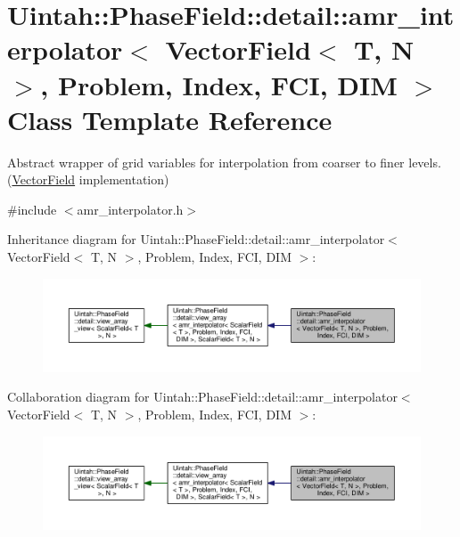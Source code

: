 \hypertarget{classUintah_1_1PhaseField_1_1detail_1_1amr__interpolator_3_01VectorField_3_01T_00_01N_01_4_00_01ab3739ebd28e1ffb5bc0b138cfaddd80}{}\section{Uintah\+:\+:Phase\+Field\+:\+:detail\+:\+:amr\+\_\+interpolator$<$ Vector\+Field$<$ T, N $>$, Problem, Index, F\+CI, D\+IM $>$ Class Template Reference}
\label{classUintah_1_1PhaseField_1_1detail_1_1amr__interpolator_3_01VectorField_3_01T_00_01N_01_4_00_01ab3739ebd28e1ffb5bc0b138cfaddd80}


Abstract wrapper of grid variables for interpolation from coarser to finer levels. (\hyperlink{structUintah_1_1PhaseField_1_1VectorField}{Vector\+Field} implementation)  




{\ttfamily \#include $<$amr\+\_\+interpolator.\+h$>$}



Inheritance diagram for Uintah\+:\+:Phase\+Field\+:\+:detail\+:\+:amr\+\_\+interpolator$<$ Vector\+Field$<$ T, N $>$, Problem, Index, F\+CI, D\+IM $>$\+:\nopagebreak
\begin{figure}[H]
\begin{center}
\leavevmode
\includegraphics[width=350pt]{classUintah_1_1PhaseField_1_1detail_1_1amr__interpolator_3_01VectorField_3_01T_00_01N_01_4_00_01ab5f6a8bab1985b8dc10c54b9c0965b3}
\end{center}
\end{figure}


Collaboration diagram for Uintah\+:\+:Phase\+Field\+:\+:detail\+:\+:amr\+\_\+interpolator$<$ Vector\+Field$<$ T, N $>$, Problem, Index, F\+CI, D\+IM $>$\+:\nopagebreak
\begin{figure}[H]
\begin{center}
\leavevmode
\includegraphics[width=350pt]{classUintah_1_1PhaseField_1_1detail_1_1amr__interpolator_3_01VectorField_3_01T_00_01N_01_4_00_013a4e3ec9316ef55d5c97281d51aeaa69}
\end{center}
\end{figure}
